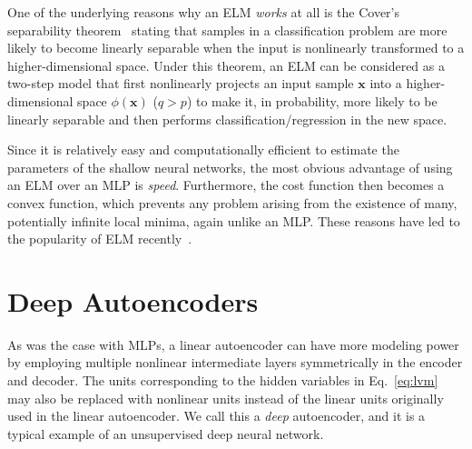\documentclass{now}
\newcommand{\vect}[1]{\mathbf{#1}}
\newcommand{\vx}[0]{\vect{x}}
\begin{document}
One of the underlying reasons why an ELM \textit{works} at all is the Cover's
separability theorem~\citep{Cover1965} stating that samples in a classification
problem are more likely to become linearly separable when the input is
nonlinearly transformed to a higher-dimensional space. Under this theorem, an
ELM can be considered as a two-step model that first nonlinearly projects an
input sample $\vx$ into a higher-dimensional space $\phi(\vx)$ ($q > p$) to make
it, in probability, more likely to be linearly separable and then performs
classification/regression in the new space.

Since it is relatively easy and computationally efficient to estimate the
parameters of the shallow neural networks, the most obvious advantage of using
an ELM over an MLP is \textit{speed}. Furthermore, the cost function then
becomes a convex function, which prevents any problem arising from the existence
of many, potentially infinite local minima, again unlike an MLP. These reasons
have led to the popularity of ELM recently~\citep{Huang2011}.




\section{Deep Autoencoders}
\label{sec:autoencoders}

As was the case with MLPs, a linear autoencoder can have more modeling power by
employing multiple nonlinear intermediate layers symmetrically in the encoder
and decoder. The units corresponding to the hidden variables in
Eq.~\eqref{eq:lvm} may also be replaced with nonlinear units instead of the
linear units originally used in the linear autoencoder. We call this a
\textit{deep} autoencoder, and it is a typical example of an unsupervised deep
neural network.
\end{document}
